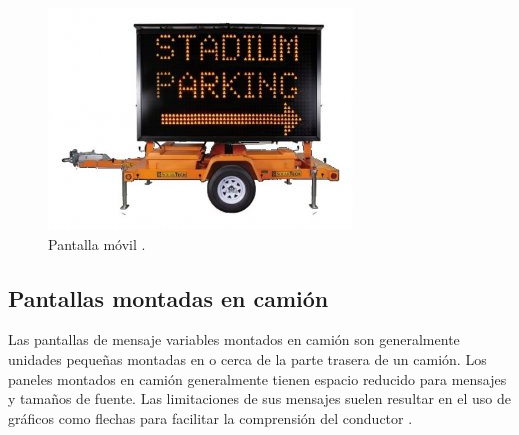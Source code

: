 \begin{figure}[htpb]
	\centering
	\includegraphics[width=.7\textwidth]{../Figures/vmsmovil.jpg} 
	\caption{Pantalla móvil \protect\footnotemark.}
	\label{fig:vmsm}
\end{figure}



\subsection{Pantallas montadas en camión}

Las pantallas de mensaje variables montados en camión son generalmente unidades pequeñas montadas en o cerca de la parte trasera de un camión. Los paneles montados en camión generalmente tienen espacio reducido para mensajes y tamaños de fuente. Las limitaciones de sus mensajes suelen resultar en el uso de gráficos como flechas para facilitar la comprensión del conductor \citep{VMSTYPES}.

